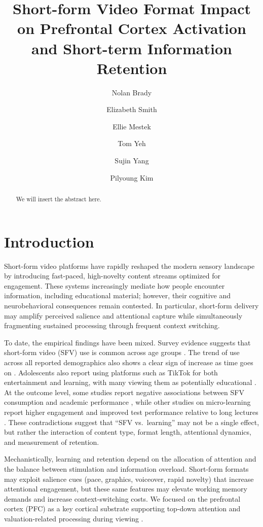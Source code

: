 \documentclass[10pt, twocolumn]{article}
\title{\textbf{Short-form Video Format Impact on Prefrontal Cortex Activation and Short-term Information Retention}}
\author[1]{Nolan Brady}
\author[2]{Elizabeth Smith}
\author[2]{Ellie Mestek}
\author[1, 4]{Tom Yeh}
\author[4]{Sujin Yang}
\author[3, 4]{Pilyoung Kim}
\affil[1]{Department of Computer Science, University of Colorado Boulder}
\affil[2]{Department of Neuroscience and Psychology, University of Colorado Boulder}
\affil[3]{Department of Psychology, University of Denver}
\affil[4]{Department of Psychology, Ewha University}
\date{} %
\begin{document}
\maketitle

\begin{abstract}
    We will insert the abstract here.
\end{abstract}

\section{Introduction}
Short-form video platforms have rapidly reshaped the modern sensory landscape by introducing fast-paced, high-novelty content streams optimized for engagement. These systems increasingly mediate how people encounter information, including educational material; however, their cognitive and neurobehavioral consequences remain contested. In particular, short-form delivery may amplify perceived salience and attentional capture while simultaneously fragmenting sustained processing through frequent context switching.

To date, the empirical findings have been mixed. Survey evidence suggests that short-form video (SFV) use is common across age groups \cite{mcclain_eddy_2026_tiktok_facts}. The trend of use across all reported demographics also shows a clear sign of increase as time goes on \cite{mcclain_eddy_2026_tiktok_facts}. Adolescents also report using platforms such as TikTok for both entertainment and learning, with many viewing them as potentially educational \cite{Adelhardt_Eberle_2024}. At the outcome level, some studies report negative associations between SFV consumption and academic performance \cite{Haliti-Sylaj_Sadiku}, while other studies on micro-learning report higher engagement and improved test performance relative to long lectures \cite{Zhu_Yuan_Zhang_Huang_Wang_Duan_Lei_Lim_Song_2022}. These contradictions suggest that ``SFV vs.\ learning'' may not be a single effect, but rather the interaction of content type, format length, attentional dynamics, and measurement of retention.

Mechanistically, learning and retention depend on the allocation of attention and the balance between stimulation and information overload. Short-form formats may exploit salience cues (pace, graphics, voiceover, rapid novelty) that increase attentional engagement, but these same features may elevate working memory demands and increase context-switching costs. We focused on the prefrontal cortex (PFC) as a key cortical substrate supporting top-down attention and valuation-related processing during viewing \cite{Miller2001AnIT, Buschman2007TopDownVB, Lavie_Hirst_de_Fockert_Viding_2004}.
\end{document}
